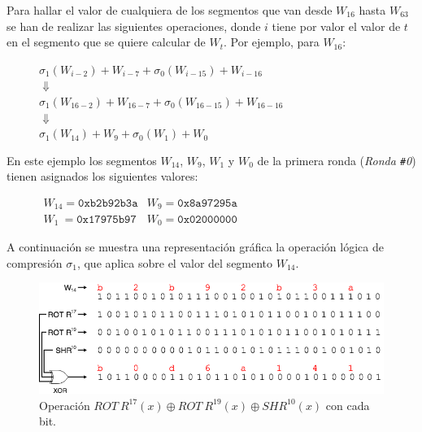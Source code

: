\documentclass{article}
\begin{document}
        Para hallar el valor de cualquiera de los segmentos que van desde $W_{16}$ hasta $W_{63}$ se han de realizar las siguientes operaciones, donde $i$ tiene por valor el valor de $t$ en el segmento que se quiere calcular de $W_t$. Por ejemplo, para $W_{16}$:
        
        \begin{figure}[H]
        \centering
            $\sigma_{1}(W_{i-2})+W_{i-7}+\sigma_{0}(W_{i-15})+W_{i-16}$ \\
            $\Downarrow$ \\
            $\sigma_{1}(W_{16-2})+W_{16-7}+\sigma_{0}(W_{16-15})+W_{16-16}$ \\
            $\Downarrow$ \\
            $\sigma_{1}(W_{14})+W_{9}+\sigma_{0}(W_{1})+W_{0}$
        \end{figure}
        
        En este ejemplo los segmentos $W_{14}$, $W_{9}$, $W_{1}$ y $W_{0}$ de la primera ronda (\textit{Ronda \texttt{\#}0}) tienen asignados los siguientes valores:
        \begin{figure}[H]
        \centering
            $\begin{array}{rl}
                W_{14} = \texttt{0xb2b92b3a} & W_{9} = \texttt{0x8a97295a} \\
                W_{1}\  = \texttt{0x17975b97} & W_{0} = \texttt{0x02000000}
            \end{array}$
        \end{figure}
        
        A continuación se muestra una representación gráfica la operación lógica de compresión $\sigma_{1}$, que aplica sobre el valor del segmento $W_{14}$.
        
        \begin{figure}[H]
        \centering
            \includegraphics[scale=0.445]{img/SHA-256-Wt_operacion_sigma1.png}
            \caption{Operación $ROT \ R^{17}(x) \oplus ROT \ R^{19}(x) \oplus SHR^{10}(x)$ con cada bit.}
        \end{figure}
        
\end{document}
